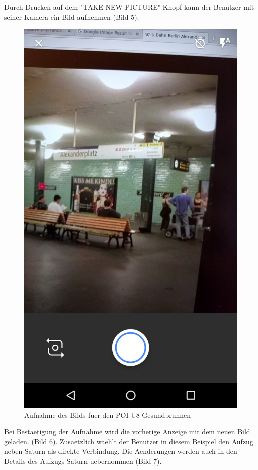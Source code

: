 \documentclass{article}
\begin{document}
Durch Drucken auf dem "TAKE NEW PICTURE" Knopf kann der Benutzer mit seiner Kamera ein Bild aufnehmen (Bild 5).


\begin{figure}[H]
	\centering
	\includegraphics[scale=0.18]{images/poi_gesundbrunnen_take_picture.png}
	\caption{Aufnahme des Bilds fuer den POI U8 Gesundbrunnen}
	\label{fig:poi_gesundbrunnen_take_picture}
\end{figure}

Bei Bestaetigung der Aufnahme wird die vorherige Anzeige mit dem neuen Bild geladen. (Bild 6). Zusaetzlich waehlt der Benutzer in diesem Beispiel den Aufzug neben Saturn als direkte Verbindung.
Die Aenderungen werden auch in den Details des Aufzugs Saturn uebernommen (Bild 7).
\end{document}
